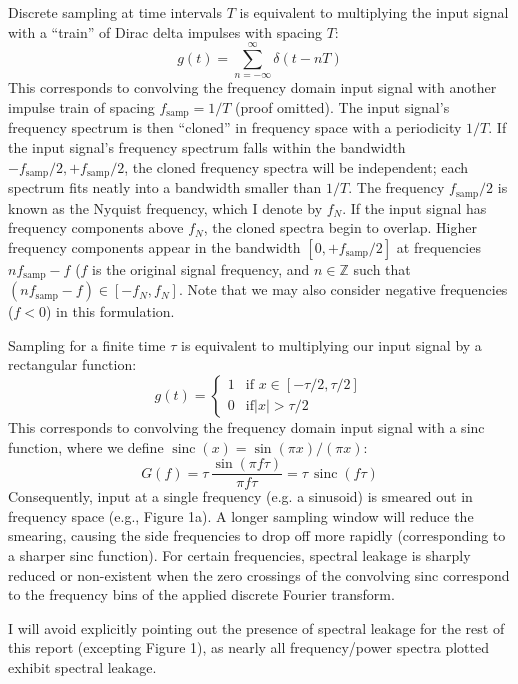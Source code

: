 \documentclass[11pt]{article}
\newcommand {\mt}{\mathrm}
\newcommand {\ints}{\mathbb{Z}}
\DeclareMathOperator{\sinc}{sinc}
\begin{document}
Discrete sampling at time intervals $T$ is equivalent to multiplying the input
signal with a ``train'' of Dirac delta impulses with spacing $T$:
\[
    g(t) = \sum_{n = -\infty}^\infty \delta (t - n T)
\]
This corresponds to convolving the frequency domain input signal with another
impulse train of spacing $f_{\mt{samp}} = 1/T$ (proof omitted).  The input
signal's frequency spectrum is then ``cloned'' in frequency space with a
periodicity $1/T$.  If the input signal's frequency spectrum falls within the
bandwidth $-f_{\mt{samp}} / 2, +f_{\mt{samp}} / 2$, the cloned frequency
spectra will be independent; each spectrum fits neatly into a bandwidth smaller
than $1/T$. The frequency $f_{\mt{samp}} / 2$ is known as the Nyquist
frequency, which I denote by $f_N$.  If the input signal has frequency
components above $f_N$, the cloned spectra begin to overlap.  Higher frequency
components appear in the bandwidth $[0, +f_{\mt{samp}} / 2]$ at frequencies
$n f_{\mt{samp}} - f$ ($f$ is the original signal frequency, and $n \in \ints$
such that $(n f_{\mt{samp}} - f) \in [-f_N, f_N]$.  Note that we may also
consider negative frequencies ($f < 0$) in this formulation.

Sampling for a finite time $\tau$ is equivalent to multiplying our input signal
by a rectangular function:
\[
    g(t) =
    \begin{cases}
        1 &\text{if } x \in [-\tau/2, \tau/2] \\
        0 &\mt{if } |x| > \tau/2
    \end{cases}
\]
This corresponds to convolving the frequency domain input signal with a sinc
function, where we define $\sinc(x) = \sin(\pi x)/(\pi x)$:
\[
    G(f) = \tau \,\frac{\sin (\pi f \tau)}{\pi f \tau}
         = \tau \,\sinc (f \tau)
\]
Consequently, input at a single frequency (e.g. a sinusoid) is smeared out in
frequency space (e.g., Figure 1a).  A longer sampling window will reduce the
smearing, causing the side frequencies to drop off more rapidly (corresponding
to a sharper sinc function).  For certain frequencies, spectral leakage is
sharply reduced or non-existent when the zero crossings of the convolving sinc
correspond to the frequency bins of the applied discrete Fourier transform.

I will avoid explicitly pointing out the presence of spectral
leakage for the rest of this report (excepting Figure 1), as nearly all
frequency/power spectra plotted exhibit spectral leakage.

\end{document}
